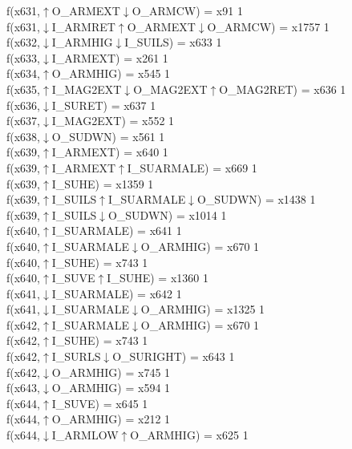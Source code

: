 f(x631,$\uparrow$O\_ARMEXT$\downarrow$O\_ARMCW) = x91 {1} \\
f(x631,$\downarrow$I\_ARMRET$\uparrow$O\_ARMEXT$\downarrow$O\_ARMCW) = x1757 {1} \\
f(x632,$\downarrow$I\_ARMHIG$\downarrow$I\_SUILS) = x633 {1} \\
f(x633,$\downarrow$I\_ARMEXT) = x261 {1} \\
f(x634,$\uparrow$O\_ARMHIG) = x545 {1} \\
f(x635,$\uparrow$I\_MAG2EXT$\downarrow$O\_MAG2EXT$\uparrow$O\_MAG2RET) = x636 {1} \\
f(x636,$\downarrow$I\_SURET) = x637 {1} \\
f(x637,$\downarrow$I\_MAG2EXT) = x552 {1} \\
f(x638,$\downarrow$O\_SUDWN) = x561 {1} \\
f(x639,$\uparrow$I\_ARMEXT) = x640 {1} \\
f(x639,$\uparrow$I\_ARMEXT$\uparrow$I\_SUARMALE) = x669 {1} \\
f(x639,$\uparrow$I\_SUHE) = x1359 {1} \\
f(x639,$\uparrow$I\_SUILS$\uparrow$I\_SUARMALE$\downarrow$O\_SUDWN) = x1438 {1} \\
f(x639,$\uparrow$I\_SUILS$\downarrow$O\_SUDWN) = x1014 {1} \\
f(x640,$\uparrow$I\_SUARMALE) = x641 {1} \\
f(x640,$\uparrow$I\_SUARMALE$\downarrow$O\_ARMHIG) = x670 {1} \\
f(x640,$\uparrow$I\_SUHE) = x743 {1} \\
f(x640,$\uparrow$I\_SUVE$\uparrow$I\_SUHE) = x1360 {1} \\
f(x641,$\downarrow$I\_SUARMALE) = x642 {1} \\
f(x641,$\downarrow$I\_SUARMALE$\downarrow$O\_ARMHIG) = x1325 {1} \\
f(x642,$\uparrow$I\_SUARMALE$\downarrow$O\_ARMHIG) = x670 {1} \\
f(x642,$\uparrow$I\_SUHE) = x743 {1} \\
f(x642,$\uparrow$I\_SURLS$\downarrow$O\_SURIGHT) = x643 {1} \\
f(x642,$\downarrow$O\_ARMHIG) = x745 {1} \\
f(x643,$\downarrow$O\_ARMHIG) = x594 {1} \\
f(x644,$\uparrow$I\_SUVE) = x645 {1} \\
f(x644,$\uparrow$O\_ARMHIG) = x212 {1} \\
f(x644,$\downarrow$I\_ARMLOW$\uparrow$O\_ARMHIG) = x625 {1} \\
